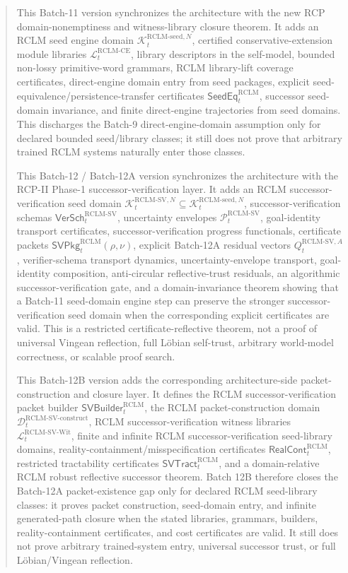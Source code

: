 \documentclass[11pt,a4paper]{article}
\newcommand{\Lcal}{\mathcal L}
\newcommand{\Pcal}{\mathcal P}
\newcommand{\Kcal}{\mathcal K}
\newcommand{\Dcal}{\mathcal D}
\newcommand{\RCLM}{\mathrm{RCLM}}
\newcommand{\CE}{\mathrm{CE}}
\begin{document}
\begin{abstract}
This Batch-11 version synchronizes the architecture with the new RCP domain-nonemptiness and witness-library closure theorem.  It adds an RCLM seed engine domain \(\Kcal_t^{\RCLM\text{-}\mathrm{seed},N}\), certified conservative-extension module libraries \(\Lcal_t^{\RCLM\text{-}\CE}\), library descriptors in the self-model, bounded non-lossy primitive-word grammars, RCLM library-lift coverage certificates, direct-engine domain entry from seed packages, explicit seed-equivalence/persistence-transfer certificates \(\mathsf{SeedEq}_t^{\RCLM}\), successor seed-domain invariance, and finite direct-engine trajectories from seed domains.  This discharges the Batch-9 direct-engine-domain assumption only for declared bounded seed/library classes; it still does not prove that arbitrary trained RCLM systems naturally enter those classes.

This Batch-12 / Batch-12A version synchronizes the architecture with the RCP-II Phase-1 successor-verification layer.  It adds an RCLM successor-verification seed domain \(\Kcal_t^{\RCLM\text{-}\mathrm{SV},N}\subseteq\Kcal_t^{\RCLM\text{-}\mathrm{seed},N}\), successor-verification schemas \(\mathsf{VerSch}_t^{\RCLM\text{-}\mathrm{SV}}\), uncertainty envelopes \(\Pcal_t^{\RCLM\text{-}\mathrm{SV}}\), goal-identity transport certificates, successor-verification progress functionals, certificate packets \(\mathsf{SVPkg}_t^{\RCLM}(\rho,\nu)\), explicit Batch-12A residual vectors \(Q_t^{\RCLM\text{-}\mathrm{SV},A}\), verifier-schema transport dynamics, uncertainty-envelope transport, goal-identity composition, anti-circular reflective-trust residuals, an algorithmic successor-verification gate, and a domain-invariance theorem showing that a Batch-11 seed-domain engine step can preserve the stronger successor-verification seed domain when the corresponding explicit certificates are valid.  This is a restricted certificate-reflective theorem, not a proof of universal Vingean reflection, full L\"obian self-trust, arbitrary world-model correctness, or scalable proof search.


This Batch-12B version adds the corresponding architecture-side packet-construction and closure layer.  It defines the RCLM successor-verification packet builder \(\mathsf{SVBuilder}_t^{\RCLM}\), the RCLM packet-construction domain \(\Dcal_t^{\RCLM\text{-}\mathrm{SV\mbox{-}construct}}\), RCLM successor-verification witness libraries \(\Lcal_t^{\RCLM\text{-}\mathrm{SV\mbox{-}Wit}}\), finite and infinite RCLM successor-verification seed-library domains, reality-containment/misspecification certificates \(\mathsf{RealCont}_t^{\RCLM}\), restricted tractability certificates \(\mathsf{SVTract}_t^{\RCLM}\), and a domain-relative RCLM robust reflective successor theorem.  Batch 12B therefore closes the Batch-12A packet-existence gap only for declared RCLM seed-library classes: it proves packet construction, seed-domain entry, and infinite generated-path closure when the stated libraries, grammars, builders, reality-containment certificates, and cost certificates are valid.  It still does not prove arbitrary trained-system entry, universal successor trust, or full L\"obian/Vingean reflection.


\end{abstract}
\end{document}
